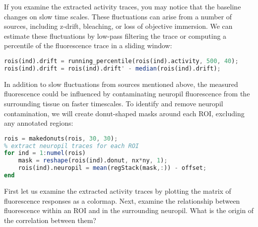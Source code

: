 \documentclass[a4paper]{report}
\newcommand{\nexercise}[0]{\arabic{exercises}\addtocounter{exercises}{1}}
\begin{document}
If you examine the extracted activity traces, you may notice that the baseline changes on slow time scales. 
These fluctuations can arise from a number of sources, including z-drift, bleaching, or loss of objective immersion.
We can estimate these fluctuations by low-pass filtering the trace or computing a percentile of the fluorescence trace in a sliding window:  
\begin{lstlisting}[language=Octave]
% estimate 40th percentile in a running window of 500 frames
rois(ind).drift = running_percentile(rois(ind).activity, 500, 40);
rois(ind).drift = rois(ind).drift' - median(rois(ind).drift);
\end{lstlisting}
In addition to slow fluctuations from sources mentioned above, the measured fluorescence could be influenced by contaminating neuropil fluorescence from the surrounding tissue on faster timescales.
To identify and remove neuropil contamination, we will create donut-shaped masks around each ROI, excluding any annotated regions:
\begin{lstlisting}[language=Octave]
% make neuropil masks around each cell excluding other labeled cells
rois = makedonuts(rois, 30, 30);
% extract neuropil traces for each ROI
for ind = 1:numel(rois)
    mask = reshape(rois(ind).donut, nx*ny, 1);
    rois(ind).neuropil = mean(regStack(mask,:)) - offset;
end
\end{lstlisting}
\begin{exercisebox}[frametitle={Exercise \nexercise: Neuropil contamination}]
First let us examine the extracted activity traces by plotting the matrix of fluorescence responses as a colormap.
Next, examine the relationship between fluorescence within an ROI and in the surrounding neuropil. What is the origin of the correlation between them?
\end{exercisebox}
\end{document}
